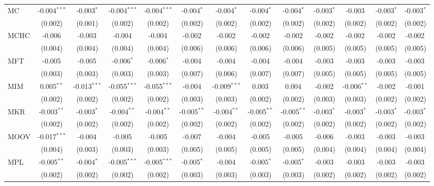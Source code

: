 \begin{table}[!htbp]
\begin{tabular}{@{\extracolsep{5pt}}lcccccccccccc}
 MC & -0.004$^{***}$ & -0.003$^{*}$ & -0.004$^{***}$ & -0.004$^{***}$ & -0.004$^{*}$ & -0.004$^{*}$ & -0.004$^{*}$ & -0.004$^{*}$ & -0.003$^{*}$ & -0.003$^{}$ & -0.003$^{*}$ & -0.003$^{*}$ \\
  & (0.002) & (0.001) & (0.002) & (0.002) & (0.002) & (0.002) & (0.002) & (0.002) & (0.002) & (0.002) & (0.002) & (0.002) \\
 MCHC & -0.006$^{}$ & -0.003$^{}$ & -0.004$^{}$ & -0.004$^{}$ & -0.002$^{}$ & -0.002$^{}$ & -0.002$^{}$ & -0.002$^{}$ & -0.002$^{}$ & -0.002$^{}$ & -0.002$^{}$ & -0.002$^{}$ \\
  & (0.004) & (0.004) & (0.004) & (0.004) & (0.006) & (0.006) & (0.006) & (0.006) & (0.005) & (0.005) & (0.005) & (0.005) \\
 MFT & -0.005$^{}$ & -0.005$^{}$ & -0.006$^{*}$ & -0.006$^{*}$ & -0.004$^{}$ & -0.004$^{}$ & -0.004$^{}$ & -0.004$^{}$ & -0.003$^{}$ & -0.003$^{}$ & -0.003$^{}$ & -0.003$^{}$ \\
  & (0.003) & (0.003) & (0.003) & (0.003) & (0.007) & (0.006) & (0.007) & (0.007) & (0.005) & (0.005) & (0.005) & (0.005) \\
 MIM & 0.005$^{**}$ & -0.013$^{***}$ & -0.055$^{***}$ & -0.055$^{***}$ & -0.004$^{}$ & -0.009$^{***}$ & 0.003$^{}$ & 0.004$^{}$ & -0.002$^{}$ & -0.006$^{**}$ & -0.002$^{}$ & -0.001$^{}$ \\
  & (0.002) & (0.002) & (0.002) & (0.002) & (0.003) & (0.003) & (0.002) & (0.002) & (0.003) & (0.003) & (0.002) & (0.002) \\
 MKR & -0.003$^{**}$ & -0.003$^{*}$ & -0.004$^{**}$ & -0.004$^{**}$ & -0.005$^{**}$ & -0.004$^{**}$ & -0.005$^{**}$ & -0.005$^{**}$ & -0.003$^{*}$ & -0.003$^{*}$ & -0.003$^{*}$ & -0.003$^{*}$ \\
  & (0.002) & (0.002) & (0.002) & (0.002) & (0.002) & (0.002) & (0.002) & (0.002) & (0.002) & (0.002) & (0.002) & (0.002) \\
 MOOV & -0.017$^{***}$ & -0.004$^{}$ & -0.005$^{}$ & -0.005$^{}$ & -0.007$^{}$ & -0.004$^{}$ & -0.005$^{}$ & -0.005$^{}$ & -0.006$^{}$ & -0.003$^{}$ & -0.003$^{}$ & -0.003$^{}$ \\
  & (0.004) & (0.003) & (0.003) & (0.003) & (0.005) & (0.005) & (0.005) & (0.005) & (0.004) & (0.004) & (0.004) & (0.004) \\
 MPL & -0.005$^{**}$ & -0.004$^{*}$ & -0.005$^{***}$ & -0.005$^{***}$ & -0.005$^{*}$ & -0.004$^{}$ & -0.005$^{*}$ & -0.005$^{*}$ & -0.003$^{}$ & -0.003$^{}$ & -0.003$^{}$ & -0.003$^{}$ \\
  & (0.002) & (0.002) & (0.002) & (0.002) & (0.003) & (0.003) & (0.003) & (0.003) & (0.002) & (0.002) & (0.002) & (0.002) \\

\end{tabular}
\end{table}

